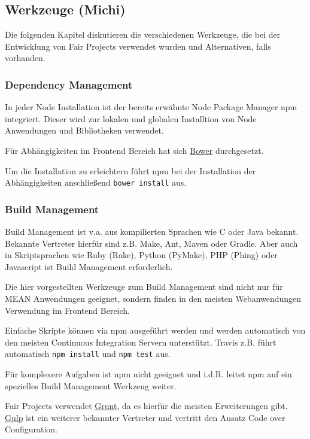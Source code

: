 \subsection{Werkzeuge (Michi)}\label{werkzeuge-michi}

Die folgenden Kapitel diskutieren die verschiedenen Werkzeuge, die bei
der Entwicklung von Fair Projects verwendet wurden und Alternativen,
falls vorhanden.

\subsubsection{Dependency Management}\label{dependency-management}

In jeder Node Installation ist der bereits erwähnte Node Package Manager
npm integriert. Dieser wird zur lokalen und globalen Installtion von
Node Anwendungen und Bibliotheken verwendet.

Für Abhängigkeiten im Frontend Bereich hat sich
\href{http://bower.io/}{Bower} durchgesetzt.

Um die Installation zu erleichtern führt npm bei der Installation der
Abhängigkeiten anschließend \texttt{bower\ install} aus.

\subsubsection{Build Management}\label{build-management}

Build Management ist v.a. aus kompilierten Sprachen wie C oder Java
bekannt. Bekannte Vertreter hierfür sind z.B. Make, Ant, Maven oder
Gradle. Aber auch in Skriptsprachen wie Ruby (Rake), Python (PyMake),
PHP (Phing) oder Javascript ist Build Management erforderlich.

Die hier vorgestellten Werkzeuge zum Build Management sind nicht nur für
MEAN Anwendungen geeignet, sondern finden in den meisten Webanwendungen
Verwendung im Frontend Bereich.

Einfache Skripte können via npm ausgeführt werden und werden automatisch
von den meisten Continuous Integration Servern unterstützt. Travis z.B.
führt automatisch \texttt{npm\ install} und \texttt{npm\ test} aus.

Für komplexere Aufgaben ist npm nicht geeignet und i.d.R. leitet npm auf
ein spezielles Build Management Werkzeug weiter.

Fair Projects verwendet \href{gruntjs.com}{Grunt}, da es hierfür die
meisten Erweiterungen gibt. \href{http://gulpjs.com/}{Gulp} ist ein
weiterer bekannter Vertreter und vertritt den Ansatz Code over
Configuration.

